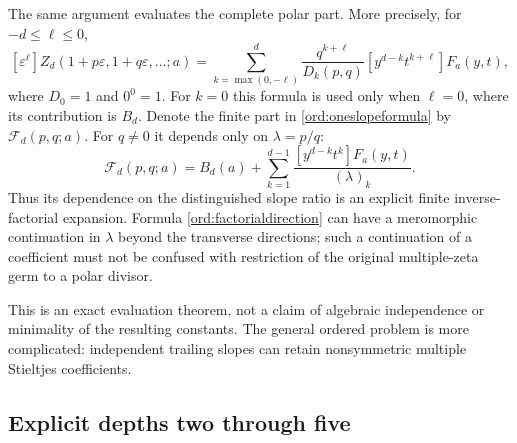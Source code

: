 The same argument evaluates the complete polar part. More precisely,
for $-d\le\ell\le0$,
\begin{equation}\label{ord:allnonpositive}
 [\varepsilon^\ell]Z_d(1+p\varepsilon,1+q\varepsilon,\ldots;a)
 =\sum_{k=\max(0,-\ell)}^d
 \frac{q^{k+\ell}}{D_k(p,q)}
 [y^{d-k}t^{k+\ell}]F_a(y,t),
\end{equation}
where $D_0=1$ and $0^0=1$. For $k=0$ this formula is used only
when $\ell=0$, where its contribution is $B_d$.
Denote the finite part in \eqref{ord:oneslopeformula} by
$\mathcal F_d(p,q;a)$. For $q\ne0$ it depends only on $\lambda=p/q$:
\begin{equation}\label{ord:factorialdirection}
 \mathcal F_d(p,q;a)=B_d(a)+
 \sum_{k=1}^{d-1}\frac{[y^{d-k}t^k]F_a(y,t)}{(\lambda)_k}.
\end{equation}
Thus its dependence on the distinguished slope ratio is an explicit
finite inverse-factorial expansion. Formula \eqref{ord:factorialdirection}
can have a meromorphic continuation in $\lambda$ beyond the transverse
directions; such a continuation of a coefficient must not be confused
with restriction of the original multiple-zeta germ to a polar divisor.

This is an exact evaluation theorem, not a claim of algebraic
independence or minimality of the resulting constants. The general
ordered problem is more complicated: independent trailing slopes can
retain nonsymmetric multiple Stieltjes coefficients.

\subsection{Explicit depths two through five}

